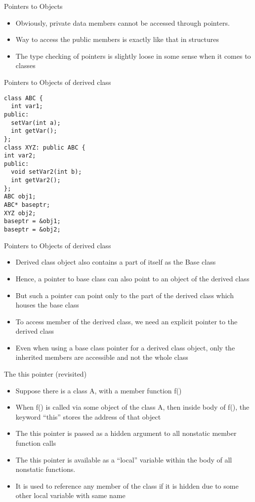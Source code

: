 \documentclass{beamer}
\begin{document}
\begin{frame}[fragile]{Pointers to Objects}
  \begin{itemize}
    \item Obviously, private data members cannot be accessed through pointers.\pause
    \item Way to access the public members is exactly like that in structures\pause
    \item The type checking of pointers is slightly loose in some sense when it comes to classes
  \end{itemize}
\end{frame}

\begin{frame}[fragile]{Pointers to Objects of derived class}
  \begin{lstlisting}
class ABC {
  int var1;
public:
  setVar(int a);
  int getVar();
};
class XYZ: public ABC {
int var2;
public:
  void setVar2(int b);
  int getVar2();
};
ABC obj1;
ABC* baseptr;
XYZ obj2;
baseptr = &obj1;
baseptr = &obj2;
  \end{lstlisting}
\end{frame}

\begin{frame}[fragile]{Pointers to Objects of derived class}
  \begin{itemize}
    \item Derived class object also contains a part of itself as the Base class\pause
    \item Hence, a pointer to base class can also point to an object of the derived class\pause
    \item But such a pointer can point only to the part of the derived class which houses the base class\pause
    \item To access member of the derived class, we need an explicit pointer to the derived class\pause
    \item Even when using a base class pointer for a derived class object, only the inherited members are accessible and not the whole class
  \end{itemize}
\end{frame}

\begin{frame}[fragile]{The this pointer (revisited)}
  \begin{itemize}
  \item Suppose there is a class A, with a member function f()\pause
  \item When f() is called via some object of the class A, then inside body of f(), the keyword ``this'' stores the address of that object\pause
  \item The this pointer is passed as a hidden argument to all nonstatic member function calls\pause
  \item The this pointer is available as a ``local'' variable within the body of all nonstatic functions.\pause
  \item It is used to reference any member of the class if it is hidden due to some other local variable with same name
  \end{itemize}
\end{frame}
\end{document}

